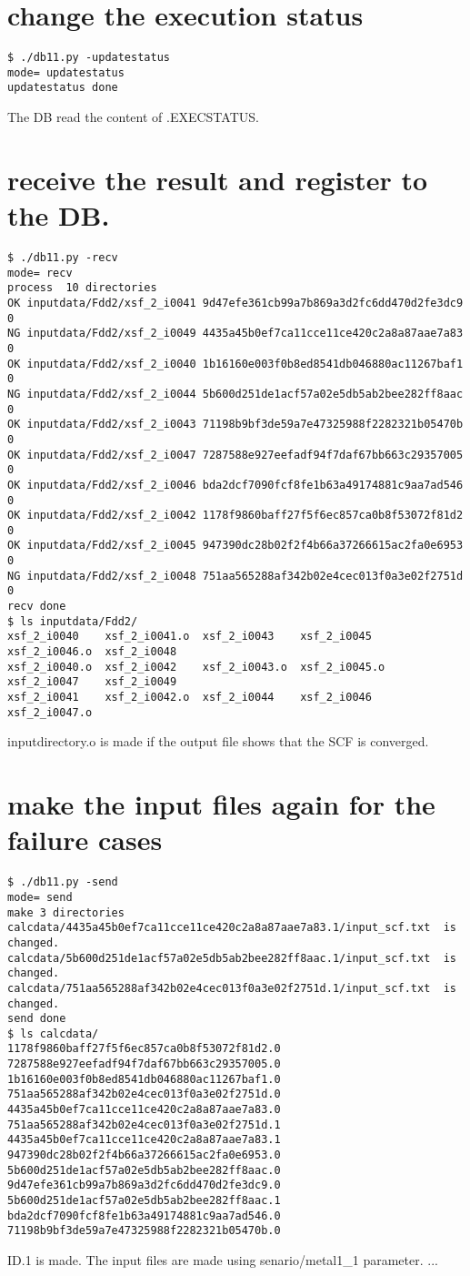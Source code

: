 \documentclass[a4paper]{article}
\begin{document}
\section{change the execution status}
\begin{verbatim}
$ ./db11.py -updatestatus
mode= updatestatus
updatestatus done
\end{verbatim}
The DB read the content of .EXECSTATUS.


\section{receive the result and register to the DB.}
\begin{verbatim}
$ ./db11.py -recv
mode= recv
process  10 directories
OK inputdata/Fdd2/xsf_2_i0041 9d47efe361cb99a7b869a3d2fc6dd470d2fe3dc9 0
NG inputdata/Fdd2/xsf_2_i0049 4435a45b0ef7ca11cce11ce420c2a8a87aae7a83 0
OK inputdata/Fdd2/xsf_2_i0040 1b16160e003f0b8ed8541db046880ac11267baf1 0
NG inputdata/Fdd2/xsf_2_i0044 5b600d251de1acf57a02e5db5ab2bee282ff8aac 0
OK inputdata/Fdd2/xsf_2_i0043 71198b9bf3de59a7e47325988f2282321b05470b 0
OK inputdata/Fdd2/xsf_2_i0047 7287588e927eefadf94f7daf67bb663c29357005 0
OK inputdata/Fdd2/xsf_2_i0046 bda2dcf7090fcf8fe1b63a49174881c9aa7ad546 0
OK inputdata/Fdd2/xsf_2_i0042 1178f9860baff27f5f6ec857ca0b8f53072f81d2 0
OK inputdata/Fdd2/xsf_2_i0045 947390dc28b02f2f4b66a37266615ac2fa0e6953 0
NG inputdata/Fdd2/xsf_2_i0048 751aa565288af342b02e4cec013f0a3e02f2751d 0
recv done
$ ls inputdata/Fdd2/
xsf_2_i0040    xsf_2_i0041.o  xsf_2_i0043    xsf_2_i0045    xsf_2_i0046.o  xsf_2_i0048
xsf_2_i0040.o  xsf_2_i0042    xsf_2_i0043.o  xsf_2_i0045.o  xsf_2_i0047    xsf_2_i0049
xsf_2_i0041    xsf_2_i0042.o  xsf_2_i0044    xsf_2_i0046    xsf_2_i0047.o
\end{verbatim}
inputdirectory.o is made if the output file shows that the SCF is converged. 

\section{make the input files again for the failure cases}
\begin{verbatim}
$ ./db11.py -send
mode= send
make 3 directories
calcdata/4435a45b0ef7ca11cce11ce420c2a8a87aae7a83.1/input_scf.txt  is changed.
calcdata/5b600d251de1acf57a02e5db5ab2bee282ff8aac.1/input_scf.txt  is changed.
calcdata/751aa565288af342b02e4cec013f0a3e02f2751d.1/input_scf.txt  is changed.
send done
$ ls calcdata/
1178f9860baff27f5f6ec857ca0b8f53072f81d2.0  7287588e927eefadf94f7daf67bb663c29357005.0
1b16160e003f0b8ed8541db046880ac11267baf1.0  751aa565288af342b02e4cec013f0a3e02f2751d.0
4435a45b0ef7ca11cce11ce420c2a8a87aae7a83.0  751aa565288af342b02e4cec013f0a3e02f2751d.1
4435a45b0ef7ca11cce11ce420c2a8a87aae7a83.1  947390dc28b02f2f4b66a37266615ac2fa0e6953.0
5b600d251de1acf57a02e5db5ab2bee282ff8aac.0  9d47efe361cb99a7b869a3d2fc6dd470d2fe3dc9.0
5b600d251de1acf57a02e5db5ab2bee282ff8aac.1  bda2dcf7090fcf8fe1b63a49174881c9aa7ad546.0
71198b9bf3de59a7e47325988f2282321b05470b.0
\end{verbatim}
ID.1 is made. The input files are made using senario/metal1\_1 parameter.
...
\end{document}
